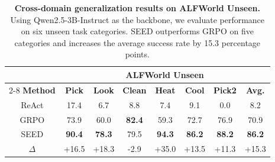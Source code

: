 \begin{table}[ht!]
\centering
\caption{\textbf{Cross-domain generalization results on ALFWorld Unseen.} Using Qwen2.5-3B-Instruct as the backbone, we evaluate performance on six unseen task categories. SEED outperforms GRPO on five categories and increases the average success rate by 15.3 percentage points.}
\vspace{0.05in}
\label{tab:ood_generalization_alfworld}
\small
\setlength{\tabcolsep}{9pt}
\renewcommand{\arraystretch}{1.08}
\begin{tabular}{cccccccc}
\toprule[1.2pt]
& \multicolumn{7}{c}{\textbf{ALFWorld Unseen}} \\
\cmidrule(lr){2-8}
\textbf{Method}
& \textbf{Pick}
& \textbf{Look}
& \textbf{Clean}
& \textbf{Heat}
& \textbf{Cool}
& \textbf{Pick2}
& \textbf{Avg.} \\
\midrule
ReAct
& 17.4
& 6.7
& 8.8
& 7.4
& 9.1
& 0.0
& 8.2 \\
GRPO
& 73.9
& 60.0
& \textbf{82.4}
& 59.3
& 72.7
& 76.9
& 70.9 \\
\rowcolor{gray!10}
SEED
& \textbf{90.4}
& \textbf{78.3}
& 79.5
& \textbf{94.3}
& \textbf{86.2}
& \textbf{88.2}
& \textbf{86.2} \\
\rowcolor{blue!6}
$\Delta$
& +16.5
& +18.3
& -2.9
& +35.0
& +13.5
& +11.3
& +15.3 \\
\bottomrule[1.2pt]
\end{tabular}
\end{table}